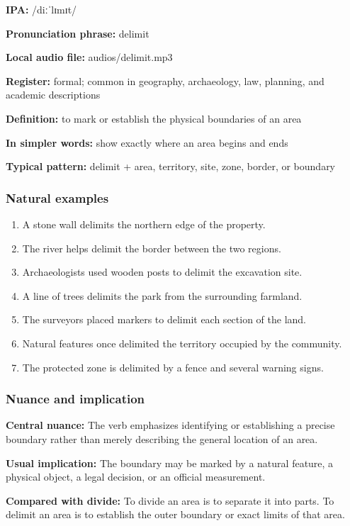 \documentclass[11pt]{article}
\begin{document}
\textbf{IPA:} /diːˈlɪmɪt/

\textbf{Pronunciation phrase:} delimit

\textbf{Local audio file:} audios/delimit.mp3

\textbf{Register:} formal; common in geography, archaeology, law, planning, and academic descriptions

\textbf{Definition:} to mark or establish the physical boundaries of an area

\textbf{In simpler words:} show exactly where an area begins and ends

\textbf{Typical pattern:} delimit + area, territory, site, zone, border, or boundary

\subsubsection{Natural examples}
\begin{enumerate}
  \item A stone wall delimits the northern edge of the property.
  \item The river helps delimit the border between the two regions.
  \item Archaeologists used wooden posts to delimit the excavation site.
  \item A line of trees delimits the park from the surrounding farmland.
  \item The surveyors placed markers to delimit each section of the land.
  \item Natural features once delimited the territory occupied by the community.
  \item The protected zone is delimited by a fence and several warning signs.
\end{enumerate}

\subsubsection{Nuance and implication}
\textbf{Central nuance:} The verb emphasizes identifying or establishing a precise boundary rather than merely describing the general location of an area.

\textbf{Usual implication:} The boundary may be marked by a natural feature, a physical object, a legal decision, or an official measurement.

\textbf{Compared with divide:} To divide an area is to separate it into parts. To delimit an area is to establish the outer boundary or exact limits of that area.
\end{document}
